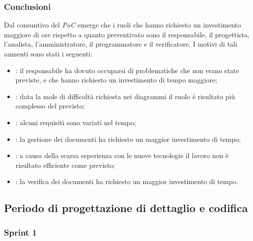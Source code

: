 \subsubsection{Conclusioni}
Dal consuntivo del \textit{PoC} emerge che i ruoli che hanno richiesto un investimento maggiore di ore rispetto a quanto preventivato sono il responsabile, il progettista, l'analista, l'amministratore, il programmatore e il verificatore. I motivi di tali aumenti sono stati i seguenti:
\begin{itemize}
    \item \roleProjectManager: il responsabile ha dovuto occuparsi di problematiche che non erano state previste, e che hanno richiesto un investimento di tempo maggiore;
    \item \roleDesigner: data la mole di difficoltà richiesta nei diagrammi il ruolo è risultato più complesso del previsto;
    \item \roleAnalyst: alcuni requisiti sono variati nel tempo;
    \item \roleAdministrator: la gestione dei documenti ha richiesto un maggior investimento di tempo;
    \item \roleProgrammer: a causa della scarsa esperienza con le nuove tecnologie il lavoro non è risultato efficiente come previsto;
    \item \roleVerifier: la verifica dei documenti ha richiesto un maggior investimento di tempo.
\end{itemize}

\subsection{Periodo di progettazione di dettaglio e codifica}
\subsubsection{Sprint 1}
\renewcommand{\arraystretch}{1.8}


